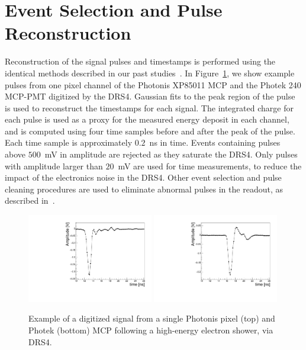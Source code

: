 \documentclass[12pt]{article}
\begin{document}
{\section{Event Selection and Pulse Reconstruction}
\label{sec:reconstruction}
Reconstruction of the signal pulses and timestamps is performed using the
identical methods described in our past
studies~\cite{Anderson:2015gha,MCPFastCaloNIMA,Ronzhin:2015pba,MCPShowerMaxPaper}.
In Figure~\ref{fig:expulse}, we show example pulses from one pixel channel of
the Photonis XP85011 MCP and the Photek 240 MCP-PMT digitized by the DRS4.
Gaussian fits to the peak region of the pulse is used to reconstruct the
timestamps for each signal. The integrated charge for each pulse is used as a
proxy for the measured energy deposit in each channel, and is computed using
four time samples before and after the peak of the pulse. Each time sample is
approximately $0.2$~ns in time. Events containing pulses above $500$~mV in
amplitude are rejected as they saturate the DRS4. Only pulses with amplitude
larger than $20$~mV are used for time measurements, to reduce the impact of the
electronics noise in the DRS4. Other event selection and pulse cleaning
procedures are used to eliminate abnormal pulses in the readout, as described
in~\cite{MCPFastCaloNIMA}. 

\begin{figure}[htbp]
	\centering
	\includegraphics[width=0.49\textwidth]{Images/expulse/pulsepix_30_2_12.pdf}
	\includegraphics[width=0.49\textwidth]{Images/expulse/pulseref_30_2_10.pdf}
	\caption{\small Example of a digitized signal from a single Photonis pixel
(top) and Photek (bottom) MCP following a high-energy electron shower, via DRS4.}
	\label{fig:expulse}
\end{figure}


}
\end{document}
